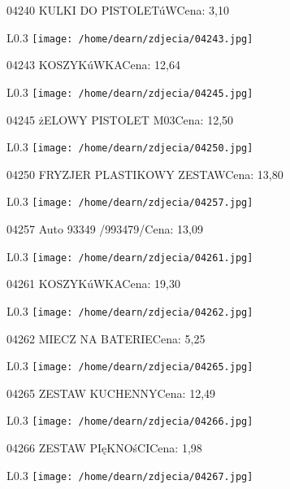 04240 KULKI DO PISTOLETúWCena: 3,10\newline
\begin{wrapfigure}{L}{0.3\textwidth}
\texttt{[image: /home/dearn/zdjecia/04243.jpg]}
\end{wrapfigure}
04243 KOSZYKúWKACena: 12,64\newline
\begin{wrapfigure}{L}{0.3\textwidth}
\texttt{[image: /home/dearn/zdjecia/04245.jpg]}
\end{wrapfigure}
04245 żELOWY PISTOLET M03Cena: 12,50\newline
\begin{wrapfigure}{L}{0.3\textwidth}
\texttt{[image: /home/dearn/zdjecia/04250.jpg]}
\end{wrapfigure}
04250 FRYZJER PLASTIKOWY ZESTAWCena: 13,80\newline
\begin{wrapfigure}{L}{0.3\textwidth}
\texttt{[image: /home/dearn/zdjecia/04257.jpg]}
\end{wrapfigure}
04257 Auto 93349 /993479/Cena: 13,09\newline
\begin{wrapfigure}{L}{0.3\textwidth}
\texttt{[image: /home/dearn/zdjecia/04261.jpg]}
\end{wrapfigure}
04261 KOSZYKúWKACena: 19,30\newline
\begin{wrapfigure}{L}{0.3\textwidth}
\texttt{[image: /home/dearn/zdjecia/04262.jpg]}
\end{wrapfigure}
04262 MIECZ NA BATERIECena: 5,25\newline
\begin{wrapfigure}{L}{0.3\textwidth}
\texttt{[image: /home/dearn/zdjecia/04265.jpg]}
\end{wrapfigure}
04265 ZESTAW KUCHENNYCena: 12,49\newline
\begin{wrapfigure}{L}{0.3\textwidth}
\texttt{[image: /home/dearn/zdjecia/04266.jpg]}
\end{wrapfigure}
04266 ZESTAW PIęKNOśCICena: 1,98\newline
\begin{wrapfigure}{L}{0.3\textwidth}
\texttt{[image: /home/dearn/zdjecia/04267.jpg]}
\end{wrapfigure}
